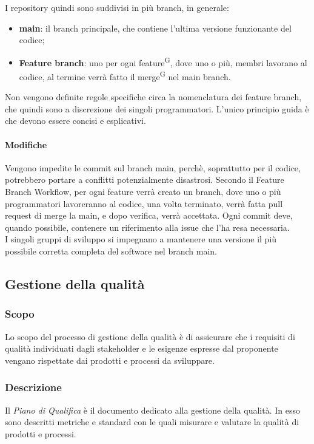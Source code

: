 I repository quindi sono suddivisi in più branch, in generale:
\begin{itemize}
\item \textbf{main}: il branch principale, che contiene l'ultima versione funzionante del codice;
\item \textbf{Feature branch}: uno per ogni feature\textsuperscript{G}, dove uno o più, membri lavorano al codice, al termine verrà fatto il merge\textsuperscript{G} nel main branch.
\end{itemize}

Non vengono definite regole specifiche circa la nomenclatura dei feature branch, che quindi sono a discrezione dei singoli programmatori. 
L'unico principio guida è che devono essere concisi e esplicativi.

\paragraph{Modifiche}
Vengono impedite le commit sul branch main, perchè, soprattutto per il codice, potrebbero portare a conflitti potenzialmente disastrosi. Secondo il Feature Branch Workflow, per ogni feature verrà creato un branch, dove uno o più programmatori lavoreranno al codice, una volta terminato, verrà fatta pull request di merge la main, e dopo verifica, verrà accettata.
Ogni commit deve, quando possibile, contenere un riferimento alla issue che l'ha resa necessaria.\\
I singoli gruppi di sviluppo si impegnano a mantenere una versione il più possibile corretta  completa del software nel branch main.


\subsection{Gestione della qualità}
\subsubsection{Scopo}
Lo scopo del processo di gestione della qualità è di assicurare che i requisiti di qualità individuati dagli stakeholder e le esigenze espresse dal proponente vengano rispettate dai prodotti e processi da sviluppare.

\subsubsection{Descrizione}
Il \textit{Piano di Qualifica} è il documento dedicato alla gestione della qualità. In esso sono descritti metriche e standard con le quali misurare e valutare la qualità di prodotti e processi.  

